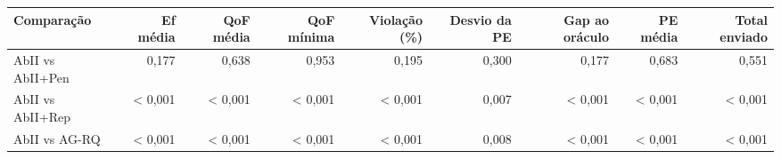 \begin{tabular}{lrrrrrrrr}
\toprule
Comparação & Ef média & QoF média & QoF mínima & Violação (\%) & Desvio da PE & Gap ao oráculo & PE média & Total enviado \\
\midrule
AbII vs AbII+Pen & 0{,}177 & 0{,}638 & 0{,}953 & 0{,}195 & 0{,}300 & 0{,}177 & 0{,}683 & 0{,}551 \\
AbII vs AbII+Rep & < 0{,}001 & < 0{,}001 & < 0{,}001 & < 0{,}001 & 0{,}007 & < 0{,}001 & < 0{,}001 & < 0{,}001 \\
AbII vs AG-RQ & < 0{,}001 & < 0{,}001 & < 0{,}001 & < 0{,}001 & 0{,}008 & < 0{,}001 & < 0{,}001 & < 0{,}001 \\
\bottomrule
\end{tabular}
